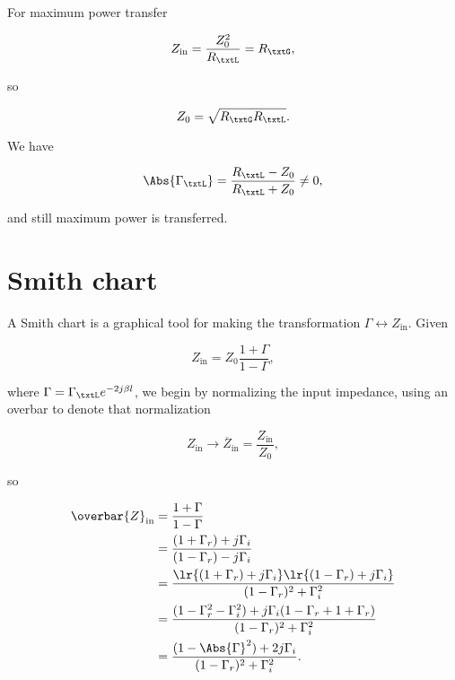 For maximum power transfer

\begin{equation}\label{eqn:uwavesDeck5SmithChartCore:300}
Z_{\textrm{in}} = \frac{Z_0^2}{R_\txtL} = R_\txtG,
\end{equation}

so

\begin{equation}\label{eqn:uwavesDeck5SmithChartCore:320}
Z_0 = \sqrt{ R_\txtG R_\txtL }.
\end{equation}

We have

\begin{equation}\label{eqn:uwavesDeck5SmithChartCore:340}
\Abs{\Gamma_\txtL} = \frac{ R_\txtL - Z_0 }{R_\txtL + Z_0} \ne 0,
\end{equation}

and still maximum power is transferred.

\section{Smith chart}

A Smith chart is a graphical tool for making the transformation \( \Gamma \leftrightarrow Z_{\textrm{in}} \).  Given

\begin{equation}\label{eqn:uwavesDeck5SmithChartCore:360}
Z_{\textrm{in}} = Z_0 \frac{ 1 + \Gamma }{ 1 - \Gamma },
\end{equation}

where \( \Gamma = \Gamma_\txtL e^{- 2 j \beta l } \), we begin by normalizing the input impedance, using an overbar to denote that normalization

\begin{equation}\label{eqn:uwavesDeck5SmithChartCore:380}
Z_{\textrm{in}} \rightarrow \overbar{Z}_{\textrm{in}} = \frac{Z_{\textrm{in}}}{Z_0},
\end{equation}

so

\begin{equation}\label{eqn:uwavesDeck5SmithChartCore:400}
\begin{aligned}
\overbar{Z}_{\textrm{in}}
&= \frac{ 1 + \Gamma }{ 1 - \Gamma }
\\ &= \frac{ (1 + \Gamma_r) + j \Gamma_i }{ (1 - \Gamma_r) - j \Gamma_i }
\\ &= \frac{ \lr{ (1 + \Gamma_r) + j \Gamma_i}\lr{(1 - \Gamma_r) + j \Gamma_i} }{ (1 - \Gamma_r)^2 + \Gamma_i^2 }
\\ &= \frac{ (1 - \Gamma_r^2 - \Gamma_i^2) + j \Gamma_i (1 - \Gamma_r + 1 + \Gamma_r ) }{ (1 - \Gamma_r)^2 + \Gamma_i^2 }
\\ &= \frac{ (1 - \Abs{\Gamma}^2) + 2 j \Gamma_i }{ (1 - \Gamma_r)^2 + \Gamma_i^2 }.
\end{aligned}
\end{equation}

